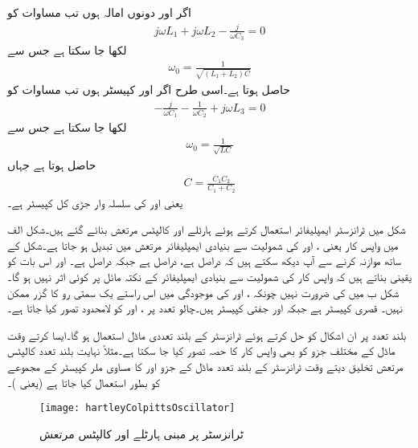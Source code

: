 اگر  اور  دونوں امالہ ہوں تب مساوات  کو
\begin{align*}
j \omega L_1 +j \omega L_2 -\frac{j}{\omega C_3}=0
\end{align*}
لکھا جا سکتا ہے جس سے
\begin{align}\label{مساوات_مرتعش_ہارٹلے_قدرتی_تعدد}
\omega_0=\frac{1}{\sqrt{\left(L_1+L_2 \right) C}}
\end{align}
حاصل ہوتا ہے۔اسی طرح اگر  اور  کپیسٹر ہوں تب مساوات  کو
\begin{align*}
-\frac{j}{\omega C_1}-\frac{1}{\omega C_2}+j \omega L_3=0
\end{align*}
لکھا جا سکتا ہے جس سے
\begin{align}\label{مساوات_مرتعش_کالپٹس_قدرتی_تعدد}
\omega_0=\frac{1}{\sqrt{L C}}
\end{align}
حاصل ہوتا ہے جہاں
\begin{align}
C=\frac{C_1 C_2}{C_1 + C_2}
\end{align}
یعنی  اور  کی سلسلہ وار جڑی کل کپیسٹر ہے۔

شکل  میں ٹرانزسٹر ایمپلیفائر استعمال کرتے ہوئے ہارٹلے اور کالپٹس مرتعش بنائے گئے ہیں۔شکل  الف میں واپس کار یعنی ،  اور  کی شمولیت سے بنیادی ایمپلیفائر مرتعش میں تبدیل ہو جاتا ہے۔شکل  کے ساتھ موازنہ کرنے سے آپ دیکھ سکتے ہیں کہ  دراصل  ہے،  دراصل  ہے جبکہ  دراصل  ہے۔ اور  اس بات کو یقینی بناتے ہیں کہ  واپس کار کی شمولیت سے بنیادی ایمپلیفائر کے نکتہ مائل پر کوئی اثر نہیں ہو گا۔شکل  ب میں  کی ضرورت نہیں چونکہ ،  اور  کی موجودگی میں اس راستے یک سمتی رو کا گزر ممکن نہیں۔ قصری کپیسٹر ہے جبکہ  اور  جفتی کپیسٹر ہیں۔چالو تعدد پر ،  اور  کو لامحدود تصور کیا جاتا ہے۔

بلند تعدد پر ان اشکال کو حل کرتے ہوئے ٹرانزسٹر کے بلند تعددی ماڈل استعمال ہو گا۔ایسا کرتے وقت ماڈل کے مختلف جزو کو بھی واپس کار کا حصہ تصور کیا جا سکتا ہے۔مثلاً نہایت بلند تعدد کالپٹس مرتعش تخلیق دیتے وقت ٹرانزسٹر کے بلند تعدد ماڈل کے جزو  اور  کا مساوی ملر کپیسٹر  کے مجموعے کو بطور  استعمال کیا جاتا ہے (یعنی )۔
%
\begin{figure}
\centering
\texttt{[image: hartleyColpittsOscillator]}
\caption{ٹرانزسٹر پر مبنی ہارٹلے اور کالپٹس مرتعش}
\label{شکل_مرتعش_ہارٹلے_کالپٹس}
\end{figure}

